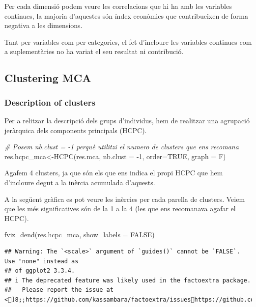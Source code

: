 \documentclass[
]{article}
\newenvironment{Shaded}{\begin{snugshade}}{\end{snugshade}}
\newcommand{\AttributeTok}[1]{\textcolor[rgb]{0.77,0.63,0.00}{#1}}
\newcommand{\CommentTok}[1]{\textcolor[rgb]{0.56,0.35,0.01}{\textit{#1}}}
\newcommand{\ConstantTok}[1]{\textcolor[rgb]{0.00,0.00,0.00}{#1}}
\newcommand{\DecValTok}[1]{\textcolor[rgb]{0.00,0.00,0.81}{#1}}
\newcommand{\FunctionTok}[1]{\textcolor[rgb]{0.00,0.00,0.00}{#1}}
\newcommand{\NormalTok}[1]{#1}
\newcommand{\OtherTok}[1]{\textcolor[rgb]{0.56,0.35,0.01}{#1}}
\newcommand{\SpecialCharTok}[1]{\textcolor[rgb]{0.00,0.00,0.00}{#1}}
\begin{document}
Per cada dimensió podem veure les correlacions que hi ha amb les
variables continues, la majoria d'aquestes són índex econòmics que
contribueixen de forma negativa a les dimensions.

Tant per variables com per categories, el fet d'incloure les variables
continues com a suplementàries no ha variat el seu resultat ni
contribució.

\hypertarget{clustering-mca}{%
\subsection{Clustering MCA}\label{clustering-mca}}

\hypertarget{description-of-clusters}{%
\subsubsection{Description of clusters}\label{description-of-clusters}}

Per a relitzar la descripció dels grups d'individus, hem de realitzar
una agrupació jeràrquica dels components principals (HCPC).

\begin{Shaded}
\begin{Highlighting}[]
\CommentTok{\# Posem nb.clust = {-}1 perquè utilitzi el numero de clusters que ens recomana}
\NormalTok{res.hcpc\_mca}\OtherTok{\textless{}{-}}\FunctionTok{HCPC}\NormalTok{(res.mca, }\AttributeTok{nb.clust =} \SpecialCharTok{{-}}\DecValTok{1}\NormalTok{, }\AttributeTok{order=}\ConstantTok{TRUE}\NormalTok{, }\AttributeTok{graph =}\NormalTok{ F)}
\end{Highlighting}
\end{Shaded}

Agafem 4 clusters, ja que són els que ens indica el propi HCPC que hem
d'incloure degut a la inèrcia acumulada d'aquests.

A la següent gràfica es pot veure les inèrcies per cada parella de
clusters. Veiem que les més significatives són de la 1 a la 4 (les que
ens recomanava agafar el HCPC).

\begin{Shaded}
\begin{Highlighting}[]
\FunctionTok{fviz\_dend}\NormalTok{(res.hcpc\_mca, }\AttributeTok{show\_labels =} \ConstantTok{FALSE}\NormalTok{)}
\end{Highlighting}
\end{Shaded}

\begin{verbatim}
## Warning: The `<scale>` argument of `guides()` cannot be `FALSE`. Use "none" instead as
## of ggplot2 3.3.4.
## i The deprecated feature was likely used in the factoextra package.
##   Please report the issue at <]8;;https://github.com/kassambara/factoextra/issueshttps://github.com/kassambara/factoextra/issues]8;;>.
\end{verbatim}
\end{document}

